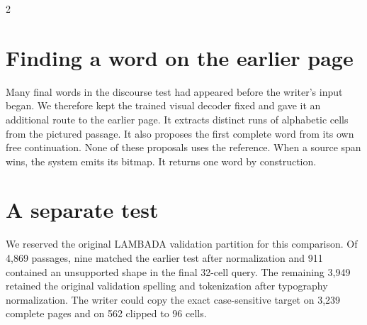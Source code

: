 \begin{multicols}{2}
\section*{Finding a word on the earlier page}
Many final words in the discourse test had appeared before the writer's input began. We therefore kept the trained visual decoder fixed and gave it an additional route to the earlier page. It extracts distinct runs of alphabetic cells from the pictured passage. It also proposes the first complete word from its own free continuation. None of these proposals uses the reference. When a source span wins, the system emits its bitmap. It returns one word by construction.
\columnbreak
\section*{A separate test}
We reserved the original LAMBADA validation partition for this comparison.\cite{lambada} Of 4,869 passages, nine matched the earlier test after normalization and 911 contained an unsupported shape in the final 32-cell query. The remaining 3,949 retained the original validation spelling and tokenization after typography normalization. The writer could copy the exact case-sensitive target on 3,239 complete pages and on 562 clipped to 96 cells.
\end{multicols}
